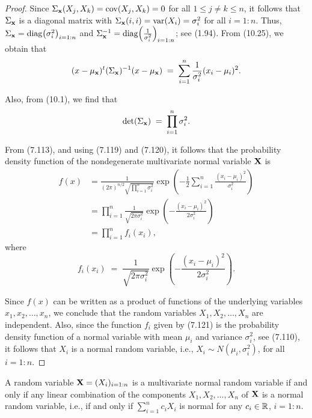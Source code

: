 \begin{proof}
Since $\Sigma_{\mathbf{x}}(X_j,X_k) = \operatorname{cov}(X_j,X_k) = 0$ for all $1 \le j \neq k \le n$, it follows
that $\Sigma_{\mathbf{x}}$ is a diagonal matrix with $\Sigma_{\mathbf{x}}(i,i) = \operatorname{var}(X_i) = \sigma_i^2$ for
all $i = 1:n$. Thus, $\Sigma_{\mathbf{x}} = \operatorname{diag}\!\left(\sigma_i^2\right)_{i=1:n}$ and
$\Sigma_{\mathbf{x}}^{-1} = \operatorname{diag}\!\left(\frac{1}{\sigma_i^2}\right)_{i=1:n}$; see (1.94). From
(10.25), we obtain that
\begin{equation}
(x-\mu_{\mathbf{x}})^t(\Sigma_{\mathbf{x}})^{-1}(x-\mu_{\mathbf{x}}) \;=\; \sum_{i=1}^n \frac{1}{\sigma_i^2}(x_i-\mu_i)^2.
\end{equation}

Also, from (10.1), we find that
\begin{equation}
\det(\Sigma_{\mathbf{x}}) \;=\; \prod_{i=1}^n \sigma_i^2.
\end{equation}

From (7.113), and using (7.119) and (7.120), it follows that the probability density function
of the nondegenerate multivariate normal variable $\mathbf{X}$ is
\begin{align*}
f(x) &= \frac{1}{(2\pi)^{n/2}\sqrt{\prod_{i=1}^n\sigma_i^2}}\exp\!\left(-\frac12\sum_{i=1}^n\frac{(x_i-\mu_i)^2}{\sigma_i^2}\right) \\
&= \prod_{i=1}^n \frac{1}{\sqrt{2\pi\sigma_i^2}}\exp\!\left(-\frac{(x_i-\mu_i)^2}{2\sigma_i^2}\right) \\
&= \prod_{i=1}^n f_i(x_i),
\end{align*}
where
\begin{equation}
f_i(x_i) \;=\; \frac{1}{\sqrt{2\pi\sigma_i^2}}\exp\!\left(-\frac{(x_i-\mu_i)^2}{2\sigma_i^2}\right).
\end{equation}

Since $f(x)$ can be written as a product of functions of the underlying variables $x_1, x_2,
\ldots, x_n$, we conclude that the random variables $X_1, X_2, \ldots, X_n$ are independent.
Also, since the function $f_i$ given by (7.121) is the probability density function of a normal
variable with mean $\mu_i$ and variance $\sigma_i^2$, see (7.110), it follows that $X_i$ is a
normal random variable, i.e., $X_i \sim N(\mu_i,\sigma_i^2)$, for all $i = 1:n$.
\end{proof}

\begin{theorem}
A random variable $\mathbf{X} = (X_i)_{i=1:n}$ is a multivariate normal random variable if and only if
any linear combination of the components $X_1, X_2, \ldots, X_n$ of $\mathbf{X}$ is a normal random
variable, i.e., if and only if $\sum_{i=1}^n c_iX_i$ is normal for any $c_i \in \mathbb{R}$, $i = 1:n$.
\end{theorem}

